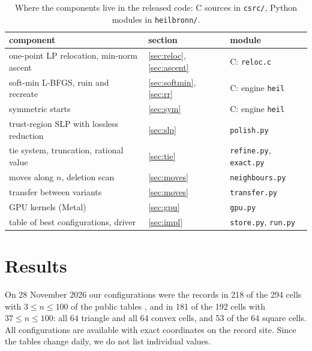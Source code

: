 \documentclass[11pt]{article}
\theoremstyle{remark}
\newcommand{\StateDate}{28 November 2026}
\newcommand{\NOurs}{218}
\newcommand{\NCells}{294}
\newcommand{\NOursBig}{181}
\newcommand{\NBig}{192}
\newcommand{\NOursBigSquare}{53}
\begin{document}
\begin{table}[t]
  \centering\small
  \begin{tabular}{lll}
    \toprule
    component & section & module \\
    \midrule
    one-point LP relocation, min-norm ascent & \ref{sec:reloc}, \ref{sec:ascent} & C: \texttt{reloc.c} \\
    soft-min L-BFGS, ruin and recreate & \ref{sec:softmin}, \ref{sec:rr} & C: engine \texttt{heil} \\
    symmetric starts & \ref{sec:sym} & C: engine \texttt{heil} \\
    trust-region SLP with lossless reduction & \ref{sec:slp} & \texttt{polish.py} \\
    tie system, truncation, rational value & \ref{sec:tie} & \texttt{refine.py}, \texttt{exact.py} \\
    moves along $n$, deletion scan & \ref{sec:moves} & \texttt{neighbours.py} \\
    transfer between variants & \ref{sec:moves} & \texttt{transfer.py} \\
    GPU kernels (Metal) & \ref{sec:gpu} & \texttt{gpu.py} \\
    table of best configurations, driver & \ref{sec:impl} & \texttt{store.py}, \texttt{run.py} \\
    \bottomrule
  \end{tabular}
  \caption{Where the components live in the released code: C sources in \texttt{csrc/}, Python modules in \texttt{heilbronn/}.}
  \label{tab:code}
\end{table}

\section{Results}\label{sec:results}

On \StateDate{} our configurations were the records in \NOurs{} of the \NCells{} cells with $3 \le n \le 100$ of the
public tables \cite{HSite}, and in \NOursBig{} of the \NBig{} cells with $37 \le n \le 100$: all $64$ triangle and all
$64$ convex cells, and \NOursBigSquare{} of the $64$ square cells. All configurations are available with exact coordinates on the
record site. Since the tables change daily, we do not list individual values.
\end{document}
